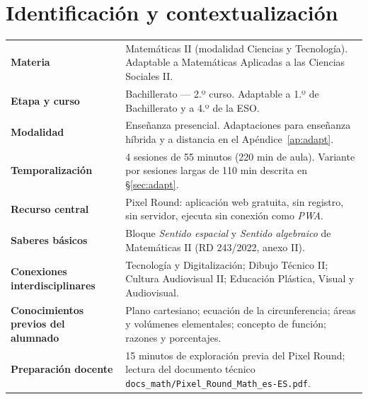 \documentclass[12pt,a4paper]{scrartcl}
\begin{document}
\renewcommand{\contentsname}{\color{accent}Índice}
\tableofcontents
\thispagestyle{fancy}
\newpage

\section{Identificación y contextualización}

\begin{center}
\begin{tabular}{@{}p{}p{}@{}}
\toprule
\textbf{Materia} & Matemáticas II (modalidad Ciencias y Tecnología). Adaptable a Matemáticas Aplicadas a las Ciencias Sociales II. \\
\addlinespace[2pt]
\textbf{Etapa y curso} & Bachillerato --- 2.º curso. Adaptable a 1.º de Bachillerato y a 4.º de la ESO. \\
\addlinespace[2pt]
\textbf{Modalidad} & Enseñanza presencial. Adaptaciones para enseñanza híbrida y a distancia en el Apéndice~\ref{ap:adapt}. \\
\addlinespace[2pt]
\textbf{Temporalización} & 4 sesiones de 55 minutos (220 min de aula). Variante por sesiones largas de 110 min descrita en §\ref{sec:adapt}. \\
\addlinespace[2pt]
\textbf{Recurso central} & Pixel Round: aplicación web gratuita, sin registro, sin servidor, ejecuta sin conexión como \emph{PWA}. \\
\addlinespace[2pt]
\textbf{Saberes básicos} & Bloque \emph{Sentido espacial} y \emph{Sentido algebraico} de Matemáticas II (RD 243/2022, anexo II). \\
\addlinespace[2pt]
\textbf{Conexiones interdisciplinares} & Tecnología y Digitalización; Dibujo Técnico II; Cultura Audiovisual II; Educación Plástica, Visual y Audiovisual. \\
\addlinespace[2pt]
\textbf{Conocimientos previos del alumnado} & Plano cartesiano; ecuación de la circunferencia; áreas y volúmenes elementales; concepto de función; razones y porcentajes. \\
\addlinespace[2pt]
\textbf{Preparación docente} & 15 minutos de exploración previa del Pixel Round; lectura del documento técnico \texttt{docs\_math/Pixel\_Round\_Math\_es-ES.pdf}. \\
\bottomrule
\end{tabular}
\end{center}
\end{document}
